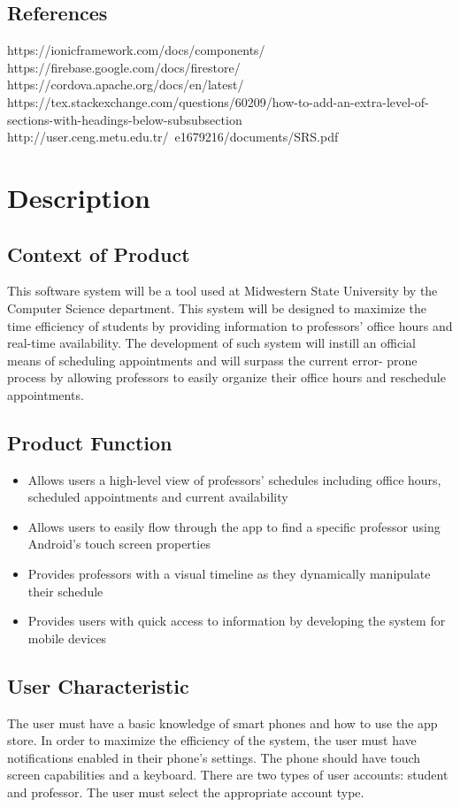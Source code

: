 \documentclass{article}
\begin{document}
  \subsection{References}
  https://ionicframework.com/docs/components/
  https://firebase.google.com/docs/firestore/
  https://cordova.apache.org/docs/en/latest/
  https://tex.stackexchange.com/questions/60209/how-to-add-an-extra-level-of-sections-with-headings-below-subsubsection
  http://user.ceng.metu.edu.tr/~e1679216/documents/SRS.pdf

  \section{Description}
  \subsection{Context of Product} 
  This software system will be a tool used at Midwestern State University by the Computer Science 
  department. This system will be designed to maximize the time efficiency of students by providing 
  information to professors' office hours and real-time availability. The development of such 
  system will instill an official means of scheduling appointments and will surpass the current error-
  prone process by allowing professors to easily organize their office hours and reschedule appointments.
  \subsection{Product Function}  
  \begin{itemize}
    \item Allows users a high-level view of professors' schedules including office hours, scheduled appointments
          and current availability
    \item Allows users to easily flow through the app to find a specific professor using Android's touch screen properties
    \item Provides professors with a visual timeline as they dynamically manipulate their schedule 
    \item Provides users with quick access to information by developing the system for mobile devices
  \end{itemize}
  \subsection{User Characteristic}
  The user must have a basic knowledge of smart phones and how to use the app store. In order to maximize 
  the efficiency of the system, the user must have notifications enabled in their phone's settings. The 
  phone should have touch screen capabilities and a keyboard. There are two types of user accounts: student
  and professor. The user must select the appropriate account type.
\end{document}
